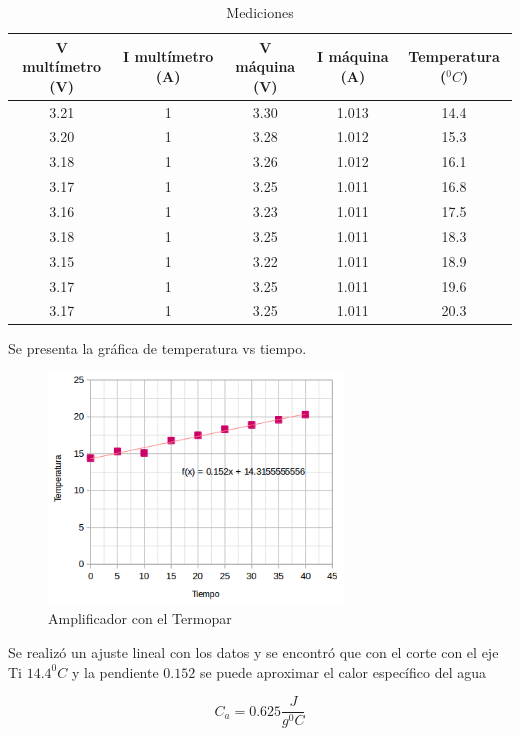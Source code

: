 \documentclass[12pt]{article}
\begin{document}
\begin{table}[H]
\centering
\begin{tabular}{|c|c|c|c|c|}
\hline
V multímetro (V)& I multímetro (A) & V máquina (V) & I máquina (A)& Temperatura ($^0C$) \\ \hline
3.21& 1& 3.30 & 1.013& 14.4 \\ \hline
3.20& 1& 3.28 & 1.012& 15.3 \\ \hline
3.18& 1& 3.26 & 1.012& 16.1 \\ \hline
3.17& 1& 3.25 & 1.011& 16.8 \\ \hline
3.16& 1& 3.23 & 1.011& 17.5 \\ \hline
3.18& 1& 3.25 & 1.011& 18.3 \\ \hline
3.15& 1& 3.22 & 1.011& 18.9 \\ \hline
3.17& 1& 3.25 & 1.011& 19.6 \\ \hline
3.17& 1& 3.25 & 1.011& 20.3 \\ \hline

\end{tabular}
\caption{Mediciones}
\label{tab:traIso}
\end{table}



Se presenta la gráfica de temperatura vs tiempo.
\begin{figure}[H]
\begin{center}
\includegraphics[width=0.7\textwidth]{pau.png}  
\caption{Amplificador con el Termopar}
\label{uno}
\end{center}
\end{figure}

Se realizó un ajuste lineal con los datos y se encontró que con el corte con el eje Ti $ 14.4 ^0C$ y la pendiente $0.152$ se puede aproximar el calor específico del agua

\begin{equation}
C_a = 0.625 \frac{J}{g ^0 C}
\end{equation}
\end{document}
